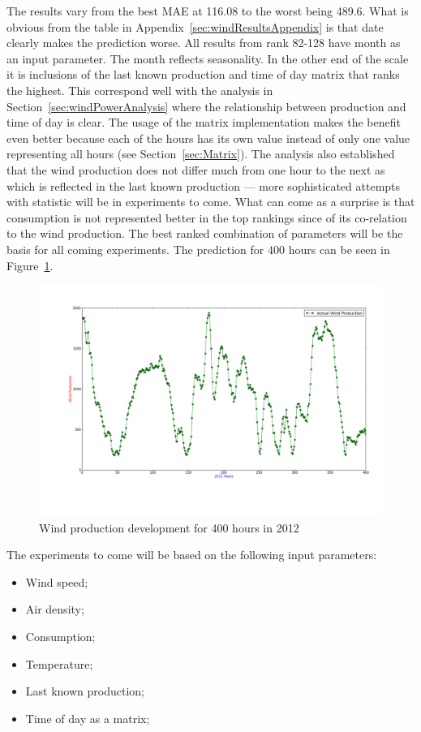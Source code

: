 The results vary from the best MAE at 116.08 to the worst being 489.6. What is obvious from the table in Appendix~\ref{sec:windResultsAppendix} is that date clearly makes the prediction worse. All results from rank 82-128 have month as an input parameter. The month reflects seasonality. In the other end of the scale it is inclusions of the last known production and time of day matrix that ranks the highest. This correspond well with the analysis in Section~\ref{sec:windPowerAnalysis} where the relationship between production and time of day is clear. The usage of the matrix implementation makes the benefit even better because each of the hours has its own value instead of only one value representing all hours (see Section~\ref{sec:Matrix}). The analysis also established that the wind production does not differ much from one hour to the next as which is reflected in the last known production --- more sophisticated attempts with statistic will be in experiments to come. What can come as a surprise is that consumption is not represented better in the top rankings since of its co-relation to the wind production.
The best ranked combination of parameters will be the basis for all coming experiments. The prediction for 400 hours can be seen in Figure~\ref{fig:bestCombiForecast400Hours}.

\begin{figure}[H]
\centering
\includegraphics[width=0.99\linewidth,natwidth=898,natheight=587]{billeder/productionTendency400Hours.png}
\caption{Wind production development for 400 hours in 2012}
\label{fig:bestCombiForecast400Hours}
\end{figure}   


The experiments to come will be based on the following input parameters:
\begin{itemize}
\item Wind speed;
\item Air density;
\item Consumption;
\item Temperature;
\item Last known production;
\item Time of day as a matrix;
\end{itemize}

